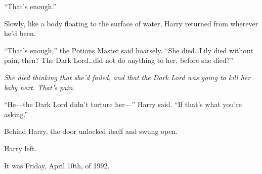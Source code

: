 “That’s enough.”

Slowly, like a body floating to the surface of water, Harry returned from wherever he’d been.

“That’s enough,” the Potions Master said hoarsely. “She died…Lily died without pain, then? The Dark Lord…did not do anything to her, before she died?”

\emph{She died thinking that she’d failed, and that the Dark Lord was going to kill her baby next. That’s pain.}

“He—the Dark Lord didn’t torture her—” Harry said. “If that’s what you’re asking.”

Behind Harry, the door unlocked itself and swung open.

Harry left.

It was Friday, April 10th, of 1992.

